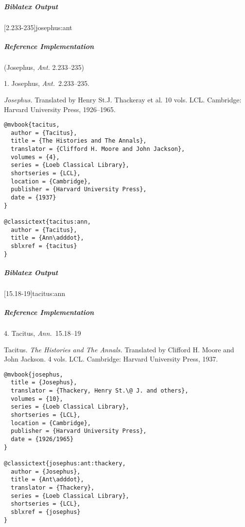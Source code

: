 \documentclass[a4paper]{article}
\newenvironment{biboutput}{%
  \subparagraph{Biblatex Output}
}{\color{black}}
\newenvironment{refimp}{%
  \subparagraph{Reference Implementation}
  \color{reference-colour}
  \rm
}{\par\color{black}}
\begin{document}
\begin{biboutput}
  [2.233-235]{josephus:ant}
\end{biboutput}

\begin{refimp}
  (Josephus, \emph{Ant.} 2.233–235)

  \hspace*{\bibindent}1. Josephus, \emph{Ant.}\ 2.233–235.

  \hangindent\bibindent \emph{Josephus.} Translated by Henry St.\@ J.
  Thackeray et al. 10 vols. LCL. Cambridge: Harvard University Press,
  1926–1965.

\end{refimp}

\medskip

\begin{lstlisting}
@mvbook{tacitus,
  author = {Tacitus},
  title = {The Histories and The Annals},
  translator = {Clifford H. Moore and John Jackson},
  volumes = {4},
  series = {Loeb Classical Library},
  shortseries = {LCL},
  location = {Cambridge},
  publisher = {Harvard University Press},
  date = {1937}
}

@classictext{tacitus:ann,
  author = {Tacitus},
  title = {Ann\adddot},
  sblxref = {tacitus}
}
\end{lstlisting}

\begin{biboutput}
  [15.18-19]{tacitus:ann}
\end{biboutput}

\begin{refimp}
  \hspace*{\bibindent}4. Tacitus, \emph{Ann.}\ 15.18–19

  \hangindent\bibindent Tacitus. \emph{The Histories and The Annals.}
  Translated by Clifford H. Moore and John Jackson. 4 vols. LCL. Cambridge:
  Harvard University Press, 1937.

\end{refimp}

\medskip

\begin{lstlisting}
@mvbook{josephus,
  title = {Josephus},
  translator = {Thackery, Henry St.\@ J. and others},
  volumes = {10},
  series = {Loeb Classical Library},
  shortseries = {LCL},
  location = {Cambridge},
  publisher = {Harvard University Press},
  date = {1926/1965}
}

@classictext{josephus:ant:thackery,
  author = {Josephus},
  title = {Ant\adddot},
  translator = {Thackery},
  series = {Loeb Classical Library},
  shortseries = {LCL},
  sblxref = {josephus}
}
\end{lstlisting}
\end{document}
